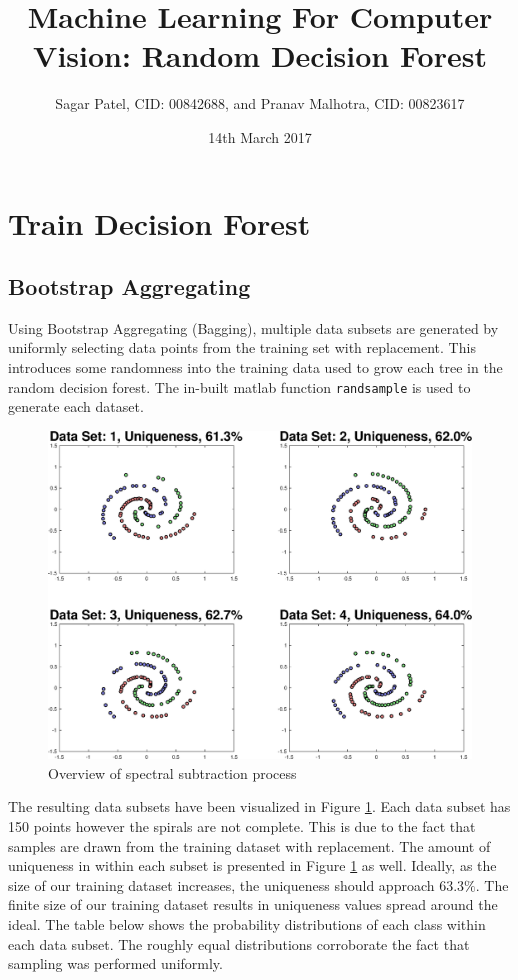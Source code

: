 \documentclass[a4paper,pra,twocolumn,10pt,aps,longbibliography,nobalancelastpage]{revtex4-1}
\begin{document}
\title{Machine Learning For Computer Vision: Random Decision Forest}
\author{Sagar Patel, CID: 00842688, and Pranav Malhotra, CID: 00823617}
\date{14th March 2017}

\maketitle

\section{Train Decision Forest}\label{sec:train}

\subsection{Bootstrap Aggregating}
Using Bootstrap Aggregating (Bagging), multiple data subsets are generated by uniformly selecting data points from the training set with replacement. This introduces some randomness into the
training data used to grow each tree in the random decision forest. The in-built matlab function \texttt{randsample} is used to generate each dataset. 

\begin{figure}[H]
	\centering
    \includegraphics[width=0.60\columnwidth]{boot_strap}
    \caption{Overview of spectral subtraction process}
    \label{fig:boot_strap}
\end{figure}

The resulting data subsets have been visualized in Figure \ref{fig:boot_strap}. Each data subset has 150 points however the spirals are not complete. This is due to the fact that samples are drawn from the training dataset with replacement. The amount of uniqueness in within each subset is presented in Figure \ref{fig:boot_strap} as well.  Ideally, as the size of our training dataset increases, the uniqueness should approach $63.3\%$. The finite size of our training dataset results in uniqueness values spread around the ideal. The table below shows the probability distributions of each class within each data subset. The roughly equal distributions corroborate the fact that sampling was performed uniformly.
\end{document}
